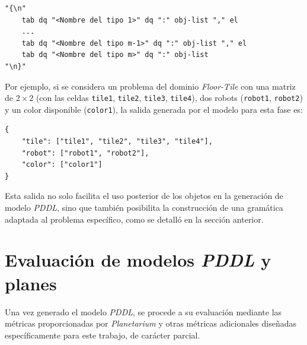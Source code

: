 \begin{tcolorbox}[colback=blue!5!white, colframe=blue!75!black, title=Estructura de diccionario por tipo, fonttitle=\bfseries, breakable]
\small
\begin{verbatim}
"{\n"
	tab dq "<Nombre del tipo 1>" dq ":" obj-list "," el
	...
	tab dq "<Nombre del tipo m-1>" dq ":" obj-list "," el
	tab dq "<Nombre del tipo m>" dq ":" obj-list
"\n}"
\end{verbatim}
\end{tcolorbox}

Por ejemplo, si se considera un problema del dominio \textit{Floor-Tile} con una matriz de \(2 \times 2\) (con las celdas \texttt{tile1}, \texttt{tile2}, \texttt{tile3}, \texttt{tile4}), dos robots (\texttt{robot1}, \texttt{robot2}) y un color disponible (\texttt{color1}), la salida generada por el modelo para esta fase es:
\begin{tcolorbox}[colback=white, colframe=gray, title=Ejemplo de salida de objetos extraídos (tipado), fonttitle=\bfseries, breakable]
\small
\begin{verbatim}
{
	"tile": ["tile1", "tile2", "tile3", "tile4"],
	"robot": ["robot1", "robot2"],
	"color": ["color1"]
}
\end{verbatim}
\end{tcolorbox}

Esta salida no solo facilita el uso posterior de los objetos en la generación de modelo \textit{PDDL}, sino que también posibilita la construcción de una gramática adaptada al problema específico, como se detalló en la sección anterior.

\section{Evaluación de modelos \textit{PDDL} y planes}

Una vez generado el modelo \textit{PDDL}, se procede a su evaluación mediante las métricas proporcionadas por \textit{Planetarium} y otras métricas adicionales diseñadas específicamente para este trabajo, de carácter parcial.

